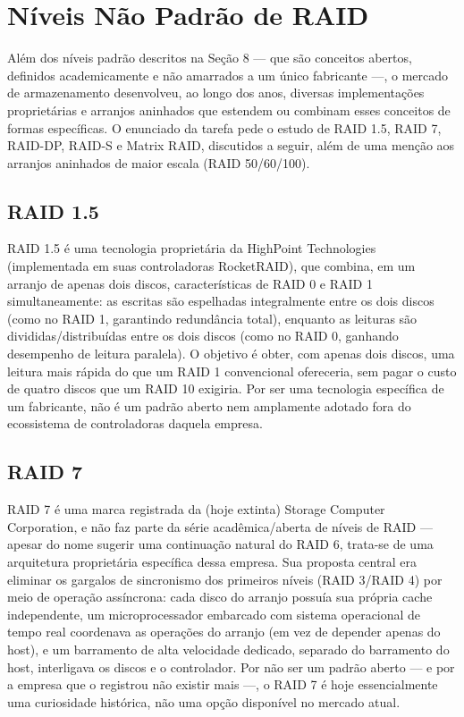 \documentclass[11pt,a4paper]{article}
\begin{document}
\section{Níveis Não Padrão de RAID}
Além dos níveis padrão descritos na Seção 8 --- que são conceitos abertos, definidos academicamente e não amarrados a um único fabricante ---, o mercado de armazenamento desenvolveu, ao longo dos anos, diversas implementações proprietárias e arranjos aninhados que estendem ou combinam esses conceitos de formas específicas. O enunciado da tarefa pede o estudo de RAID 1.5, RAID 7, RAID-DP, RAID-S e Matrix RAID, discutidos a seguir, além de uma menção aos arranjos aninhados de maior escala (RAID 50/60/100).

\subsection{RAID 1.5}
RAID 1.5 é uma tecnologia proprietária da HighPoint Technologies (implementada em suas controladoras RocketRAID), que combina, em um arranjo de apenas dois discos, características de RAID 0 e RAID 1 simultaneamente: as escritas são espelhadas integralmente entre os dois discos (como no RAID 1, garantindo redundância total), enquanto as leituras são divididas/distribuídas entre os dois discos (como no RAID 0, ganhando desempenho de leitura paralela). O objetivo é obter, com apenas dois discos, uma leitura mais rápida do que um RAID 1 convencional ofereceria, sem pagar o custo de quatro discos que um RAID 10 exigiria. Por ser uma tecnologia específica de um fabricante, não é um padrão aberto nem amplamente adotado fora do ecossistema de controladoras daquela empresa.

\subsection{RAID 7}
RAID 7 é uma marca registrada da (hoje extinta) Storage Computer Corporation, e não faz parte da série acadêmica/aberta de níveis de RAID --- apesar do nome sugerir uma continuação natural do RAID 6, trata-se de uma arquitetura proprietária específica dessa empresa. Sua proposta central era eliminar os gargalos de sincronismo dos primeiros níveis (RAID 3/RAID 4) por meio de operação assíncrona: cada disco do arranjo possuía sua própria cache independente, um microprocessador embarcado com sistema operacional de tempo real coordenava as operações do arranjo (em vez de depender apenas do host), e um barramento de alta velocidade dedicado, separado do barramento do host, interligava os discos e o controlador. Por não ser um padrão aberto --- e por a empresa que o registrou não existir mais ---, o RAID 7 é hoje essencialmente uma curiosidade histórica, não uma opção disponível no mercado atual.
\end{document}
